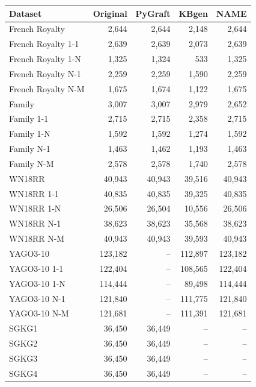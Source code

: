 \begin{tabular}{lrrrr}
\toprule
Dataset & Original & PyGraft & KBgen & NAME \\
\midrule
French Royalty & 2{,}644 & 2{,}644 & 2{,}148 & 2{,}644 \\
French Royalty 1-1 & 2{,}639 & 2{,}639 & 2{,}073 & 2{,}639 \\
French Royalty 1-N & 1{,}325 & 1{,}324 & 533 & 1{,}325 \\
French Royalty N-1 & 2{,}259 & 2{,}259 & 1{,}590 & 2{,}259 \\
French Royalty N-M & 1{,}675 & 1{,}674 & 1{,}122 & 1{,}675 \\
\midrule
Family & 3{,}007 & 3{,}007 & 2{,}979 & 2{,}652 \\
Family 1-1 & 2{,}715 & 2{,}715 & 2{,}358 & 2{,}715 \\
Family 1-N & 1{,}592 & 1{,}592 & 1{,}274 & 1{,}592 \\
Family N-1 & 1{,}463 & 1{,}462 & 1{,}193 & 1{,}463 \\
Family N-M & 2{,}578 & 2{,}578 & 1{,}740 & 2{,}578 \\
\midrule
WN18RR & 40{,}943 & 40{,}943 & 39{,}516 & 40{,}943 \\
WN18RR 1-1 & 40{,}835 & 40{,}835 & 39{,}325 & 40{,}835 \\
WN18RR 1-N & 26{,}506 & 26{,}504 & 10{,}556 & 26{,}506 \\
WN18RR N-1 & 38{,}623 & 38{,}623 & 35{,}568 & 38{,}623 \\
WN18RR N-M & 40{,}943 & 40{,}943 & 39{,}593 & 40{,}943 \\
\midrule
YAGO3-10 & 123{,}182 & – & 112{,}897 & 123{,}182 \\
YAGO3-10 1-1 & 122{,}404 & – & 108{,}565 & 122{,}404 \\
YAGO3-10 1-N & 114{,}444 & – & 89{,}498 & 114{,}444 \\
YAGO3-10 N-1 & 121{,}840 & – & 111{,}775 & 121{,}840 \\
YAGO3-10 N-M & 121{,}681 & – & 111{,}391 & 121{,}681 \\
\midrule
SGKG1 & 36{,}450 & 36{,}449 & – & – \\
SGKG2 & 36{,}450 & 36{,}449 & – & – \\
SGKG3 & 36{,}450 & 36{,}449 & – & – \\
SGKG4 & 36{,}450 & 36{,}449 & – & – \\
\bottomrule
\end{tabular}
